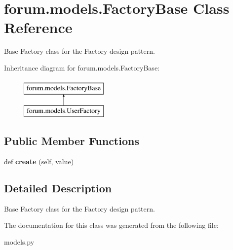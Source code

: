 \hypertarget{classforum_1_1models_1_1_factory_base}{}\section{forum.\+models.\+Factory\+Base Class Reference}
\label{classforum_1_1models_1_1_factory_base}


Base Factory class for the Factory design pattern.  


Inheritance diagram for forum.\+models.\+Factory\+Base\+:\begin{figure}[H]
\begin{center}
\leavevmode
\includegraphics[height=2.000000cm]{classforum_1_1models_1_1_factory_base}
\end{center}
\end{figure}
\subsection*{Public Member Functions}
\begin{DoxyCompactItemize}
\item 
\mbox{\label{classforum_1_1models_1_1_factory_base_a7ec5aa659cab107be541ef9468d483c1}} 
def {\bfseries create} (self, value)
\end{DoxyCompactItemize}


\subsection{Detailed Description}
Base Factory class for the Factory design pattern. 

The documentation for this class was generated from the following file\+:\begin{DoxyCompactItemize}
\item 
models.\+py\end{DoxyCompactItemize}

